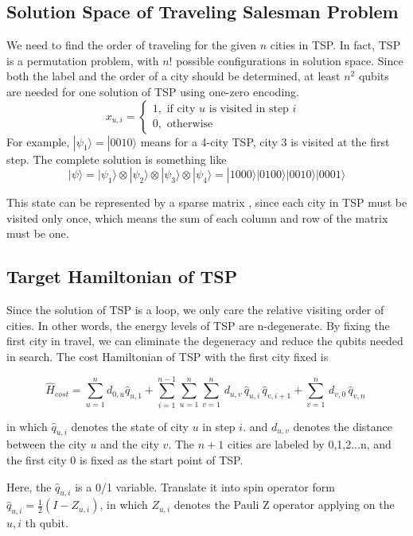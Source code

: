 \documentclass[aps,pra,twocolumn,superscriptaddress]{revtex4-2}
\begin{document}
\subsection{Solution Space of Traveling Salesman Problem}
We need to find the order of traveling for the given $n$ cities in TSP. In fact, TSP is a permutation problem, with $n!$ possible configurations in solution space. Since both the label and the order of a city should be determined, at least $n^2$ qubits are needed for one solution of TSP using one-zero encoding.
$$
x_{u,i}=
\begin{cases}
1, \text{ if city $u$ is visited in step $i$ } \\
0, \text{ otherwise}
\end{cases}
$$
For example, $|\psi_1\rangle=|0010\rangle$ means for a 4-city TSP, city 3 is visited at the first step. The complete solution is something like 
$$|\psi\rangle=|\psi_1\rangle\otimes|\psi_2\rangle\otimes|\psi_3\rangle\otimes|\psi_4\rangle=|1000\rangle|0100\rangle |0010\rangle |0001\rangle$$

This state can be represented by a sparse matrix , since each city in TSP must be visited only once, which means the sum of each column and row of the matrix must be one.

\subsection{Target Hamiltonian of TSP}
Since the solution of TSP is a loop, we only care the relative visiting order of cities. In other words, the energy levels of TSP are n-degenerate. By fixing the first city in travel, we can eliminate the degeneracy and reduce the qubits needed in search. The cost Hamiltonian of TSP with the first city fixed is 

$$
\hat H_{cost}=\sum_{u=1}^{n}d_{0,u}\hat q_{u,1}+\sum_{i=1}^{n-1}\sum_{u=1}^{n}\sum_{v=1}^{n}\,d_{u,v}\, \hat q_{u,i}\, \hat q_{v,i+1}+\sum_{v=1}^{n}\,d_{v,0}\,\hat q_{v,n}\
$$

in which $\hat q_{u,i}$ denotes the state of city $u$ in step $i$. 
and $d_{u,v}$ denotes the distance between the city $u$ and the city $v$. The $n+1$ cities are labeled by {0,1,2...n}, and the first city 0 is fixed as the start point of TSP.

Here, the $\hat q_{u,i}$ is a 0/1 variable. Translate it into spin operator form $\hat q_{u,i}=\frac{1}{2}(I-Z_{u,i})$, in which $Z_{u,i}$ denotes the Pauli Z operator applying on the ${u,i}$ th qubit.
\end{document}
